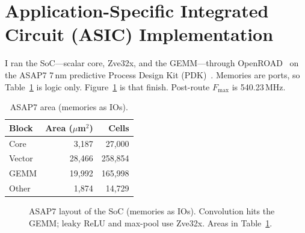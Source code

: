 \section{Application-Specific Integrated Circuit ({ASIC}) Implementation}
\label{sec:impl}


I ran the {SoC}---scalar core, {Zve32x}, and the {GEMM}---through
Open{ROAD}~\cite{ajayi2019openroad} on the {ASAP7} 7\,nm predictive
Process Design Kit ({PDK})~\cite{clark2016asap7}.
Memories are ports, so Table~\ref{tab:asap7} is logic only.
Figure~\ref{fig:die} is that finish.
Post-route $F_{\max}$ is 540.23\,{MHz}.

\begin{table}[H]
  \caption{{ASAP7} area (memories as {IOs}).}
  \label{tab:asap7}
  \centering
  \small
  \begin{tabular}{@{}lrr@{}}
    \toprule
    Block & Area ($\mu$m$^{2}$) & Cells \\
    \midrule
    Core   & 3{,}187  & 27{,}000 \\
    Vector & 28{,}466 & 258{,}854 \\
    {GEMM} & 19{,}992 & 165{,}998 \\
    Other  & 1{,}874  & 14{,}729 \\
    \bottomrule
  \end{tabular}
\end{table}

\begin{figure}[t]
  \centering
  
  \caption{{ASAP7} layout of the {SoC} (memories as {IOs}).
    Convolution hits the {GEMM}; leaky {ReLU} and max-pool use
    {Zve32x}.
    Areas in Table~\ref{tab:asap7}.}
  \label{fig:die}
\end{figure}
